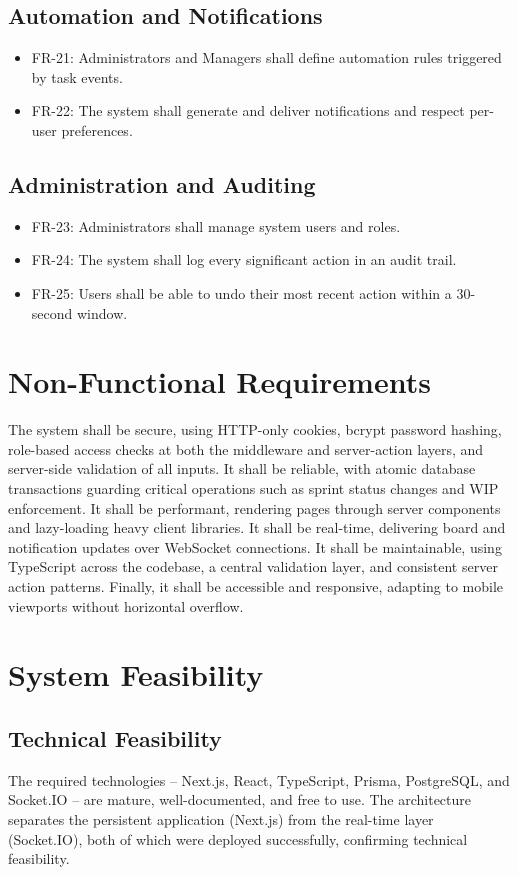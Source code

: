 \documentclass[12pt,a4paper]{report}
\begin{document}
\subsection{Automation and Notifications}
\begin{itemize}
  \item FR-21: Administrators and Managers shall define automation rules triggered
        by task events.
  \item FR-22: The system shall generate and deliver notifications and respect
        per-user preferences.
\end{itemize}
\subsection{Administration and Auditing}
\begin{itemize}
  \item FR-23: Administrators shall manage system users and roles.
  \item FR-24: The system shall log every significant action in an audit trail.
  \item FR-25: Users shall be able to undo their most recent action within a
        30-second window.
\end{itemize}

\section{Non-Functional Requirements}
The system shall be secure, using HTTP-only cookies, bcrypt password hashing,
role-based access checks at both the middleware and server-action layers, and
server-side validation of all inputs. It shall be reliable, with atomic database
transactions guarding critical operations such as sprint status changes and WIP
enforcement. It shall be performant, rendering pages through server components and
lazy-loading heavy client libraries. It shall be real-time, delivering board and
notification updates over WebSocket connections. It shall be maintainable, using
TypeScript across the codebase, a central validation layer, and consistent server
action patterns. Finally, it shall be accessible and responsive, adapting to
mobile viewports without horizontal overflow.

\section{System Feasibility}
\subsection{Technical Feasibility}
The required technologies -- Next.js, React, TypeScript, Prisma, PostgreSQL, and
Socket.IO -- are mature, well-documented, and free to use. The architecture
separates the persistent application (Next.js) from the real-time layer
(Socket.IO), both of which were deployed successfully, confirming technical
feasibility.
\end{document}
